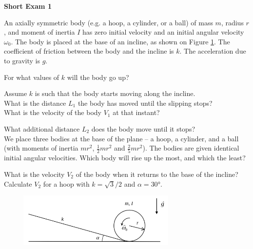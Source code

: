 \documentclass[../TST.tex]{subfiles}
\begin{document}
\begin{large}
	\textbf{Short Exam 1}
\end{large}

\begin{sproblem}
An axially symmetric body (e.g. a hoop, a cylinder, or a ball) of mass $m$, radius $r$, and moment of inertia $I$ has zero initial velocity and an initial angular velocity $\omega_0$. The body is placed at the base of an incline, as shown on Figure \ref{fig1}. The coefficient of friction between the body and the incline is $k$. The acceleration due to gravity is $g$.
\begin{subpart}
	\item For what values of $k$ will the body go up? 
	\item Assume $k$ is such that the body starts moving along the incline.\\
		What is the distance $L_1$ the body has moved until the slipping stops?	\\
		What is the velocity of the body $V_1$ at that instant? 
	\item What additional distance $L_2$ does the body move until it stops? \\
		We place three bodies at the base of the plane -- a hoop, a cylinder, and a ball (with moments of inertia $mr^2$, $\frac{1}{2}mr^2$ and $\frac{2}{5}mr^2$). The bodies are given identical initial angular velocities. Which body will rise up the most, and which the least?
	\item What is the velocity $V_2$ of the body when it returns to the base of the incline? \\
		Calculate $V_2$ for a hoop with $k=\sqrt{3}/2$ and $\alpha=\ang{30}$.
\end{subpart}
\begin{figure}[h]
		\centering
\includegraphics[width=0.7\textwidth]{fig/2010_l1.png}
    \caption{}
	\label{fig1}
\end{figure}
\end{sproblem}
\end{document}
